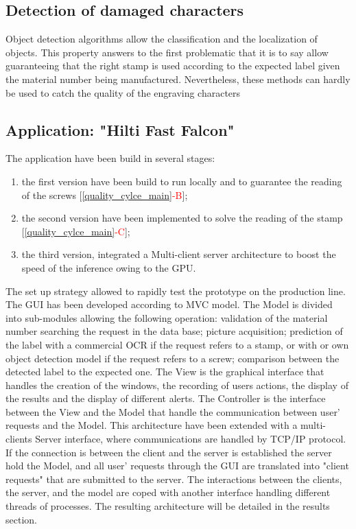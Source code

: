 \documentclass[12pt, french, a4paper]{article} %
\begin{document}
\subsection{Detection of damaged characters}
Object detection algorithms allow the classification and the localization of objects. This property answers to the first problematic that it is to say allow guaranteeing that the right stamp is used according to the expected label given the material number being manufactured. Nevertheless, these methods can hardly be used to catch the quality of the engraving characters
\subsection{Application: "Hilti Fast Falcon"}
The application have been build in several stages:
\begin{enumerate}
\itemsep0em 
 \item the first version have been build to run locally and to guarantee the reading of the screws [\ref{quality_cylce_main}\textcolor{red}{-B}];
 \item the second version have been implemented to solve the reading of the stamp [\ref{quality_cylce_main}\textcolor{red}{-C}];
 \item the third version, integrated a Multi-client server architecture to boost the speed of the inference owing to the \gls{GPU}.
\end{enumerate}
The set up strategy allowed to rapidly test the prototype on the production line. The \gls{GUI} has been developed according to \gls{MVC} model. The Model is divided into sub-modules allowing the following operation: validation of the material number searching the request in the data base; picture acquisition; prediction of the label with a commercial OCR if the request refers to a stamp, or with or own object detection model if the request refers to a screw; comparison between the detected label to the expected one. The View is the graphical interface that handles the creation of the windows, the recording of users actions, the display of the results and the display of different alerts. The Controller is the interface between the View and the Model that handle the communication between user' requests and the Model. This architecture have been extended with a multi-clients Server interface, where communications are handled by TCP/IP protocol. If the connection is between the client and the server is established the server hold the Model, and all user' requests through the \gls{GUI} are translated into "client requests" that are submitted to the server. The interactions between the clients, the server, and the model are coped with another interface handling different threads of processes. The resulting architecture will be detailed in the results section.
\end{document}
